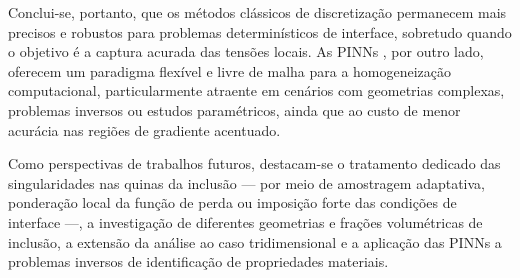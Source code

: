 \documentclass[brazil]{TCAM} %
\begin{document}
Conclui-se, portanto, que os métodos clássicos de discretização permanecem mais precisos e robustos para problemas determinísticos de interface, sobretudo quando o objetivo é a captura acurada das tensões locais. As PINNs \cite{raissi2019pinn}, por outro lado, oferecem um paradigma flexível e livre de malha para a homogeneização computacional, particularmente atraente em cenários com geometrias complexas, problemas inversos ou estudos paramétricos, ainda que ao custo de menor acurácia nas regiões de gradiente acentuado.

Como perspectivas de trabalhos futuros, destacam-se o tratamento dedicado das singularidades nas quinas da inclusão — por meio de amostragem adaptativa, ponderação local da função de perda ou imposição forte das condições de interface —, a investigação de diferentes geometrias e frações volumétricas de inclusão, a extensão da análise ao caso tridimensional e a aplicação das PINNs a problemas inversos de identificação de propriedades materiais.



\end{document}
